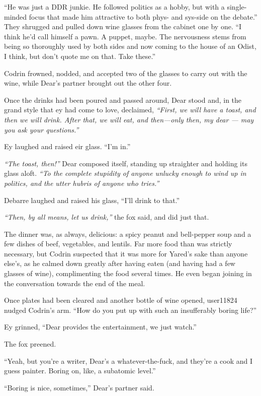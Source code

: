 ``He was just a DDR junkie. He followed politics as a hobby, but with a single-minded focus that made him attractive to both phys- and sys-side on the debate.'' They shrugged and pulled down wine glasses from the cabinet one by one. ``I think he'd call himself a pawn. A puppet, maybe. The nervousness stems from being so thoroughly used by both sides and now coming to the house of an Odist, I think, but don't quote me on that. Take these.''

Codrin frowned, nodded, and accepted two of the glasses to carry out with the wine, while Dear's partner brought out the other four.

Once the drinks had been poured and passed around, Dear stood and, in the grand style that ey had come to love, declaimed, \emph{``First, we will have a toast, and then we will drink. After that, we will eat, and then---only then, my dear — may you ask your questions.''}

Ey laughed and raised eir glass. ``I'm in.''

\emph{``The toast, then!''} Dear composed itself, standing up straighter and holding its glass aloft. \emph{``To the complete stupidity of anyone unlucky enough to wind up in politics, and the utter hubris of anyone who tries.''}

Debarre laughed and raised his glass, ``I'll drink to that.''

\emph{``Then, by all means, let us drink,''} the fox said, and did just that.

The dinner was, as always, delicious: a spicy peanut and bell-pepper soup and a few dishes of beef, vegetables, and lentils. Far more food than was strictly necessary, but Codrin suspected that it was more for Yared's sake than anyone else's, as he calmed down greatly after having eaten (and having had a few glasses of wine), complimenting the food several times. He even began joining in the conversation towards the end of the meal.

Once plates had been cleared and another bottle of wine opened, user11824 nudged Codrin's arm. ``How do you put up with such an insufferably boring life?''

Ey grinned, ``Dear provides the entertainment, we just watch.''

The fox preened.

``Yeah, but you're a writer, Dear's a whatever-the-fuck, and they're a cook and I guess painter. Boring on, like, a subatomic level.''

``Boring is nice, sometimes,'' Dear's partner said.

